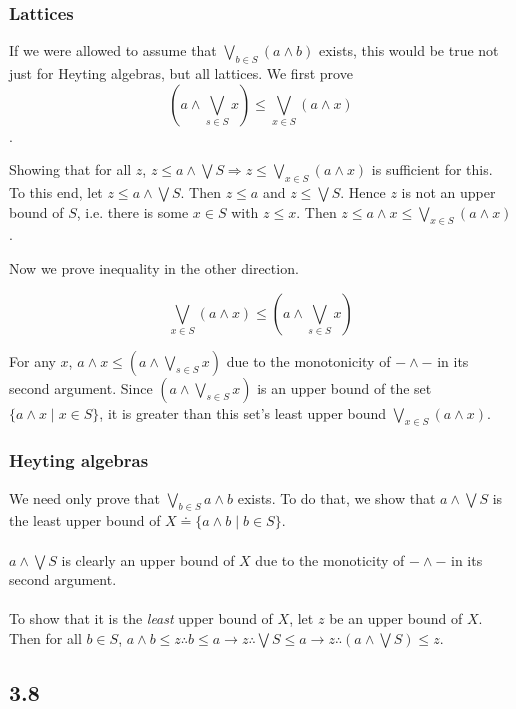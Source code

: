 \documentclass{article}
\begin{document}
\subsubsection*{Lattices}

If we were allowed to assume that $\bigvee_{b \in S} (a \wedge b)$ exists, this would be true not just for Heyting 
algebras, but all lattices. We first prove $$(a \wedge \bigvee_{s \in S} x) \leq \bigvee_{x \in S} (a \wedge x)$$.

Showing that for all $z$, $z \leq a \wedge \bigvee S \Rightarrow z \leq \bigvee_{x \in S}(a \wedge x)$ 
is sufficient for this. To this end, let $z \leq a \wedge \bigvee S$. Then $z \leq a$ and $z \leq \bigvee S$. Hence $z$ is not an upper bound of $S$, i.e. there is some $x \in S$ with $z \leq x$. Then $z \leq a \wedge x \leq \bigvee_{x \in S} (a \wedge x)$.

Now we prove inequality in the other direction.

$$\bigvee_{x \in S} (a \wedge x) \leq (a \wedge \bigvee_{s \in S} x)$$

For any $x$, $a \wedge x \leq (a \wedge \bigvee_{s \in S} x)$ due to the monotonicity of $- \wedge -$ in its second argument. Since $(a \wedge \bigvee_{s \in S} x)$ is an upper bound of the set $\{ a \wedge x \mid x \in S \}$, it is greater than this set's least upper bound $\bigvee_{x \in S} (a \wedge x)$.   

\subsubsection*{Heyting algebras}

We need only prove that $\bigvee_{b \in S} a \wedge b$ exists. To do that, we show that $a \wedge \bigvee S$ is the least upper 
bound of $X \doteq \{ a \wedge b \mid b \in S \}$.\\~\\
$a \wedge \bigvee S$ is clearly an upper bound of $X$ due to the monoticity of $-\wedge-$ in its second argument.\\~\\
To show that it is the \emph{least} upper bound of $X$, let $z$ be an upper bound of $X$. Then for all $b \in S$, $a \wedge b \leq z \therefore b \leq a \to z \therefore \bigvee S \leq a \to z \therefore (a \wedge \bigvee S) \leq z$. 

\subsection*{3.8}
\end{document}
